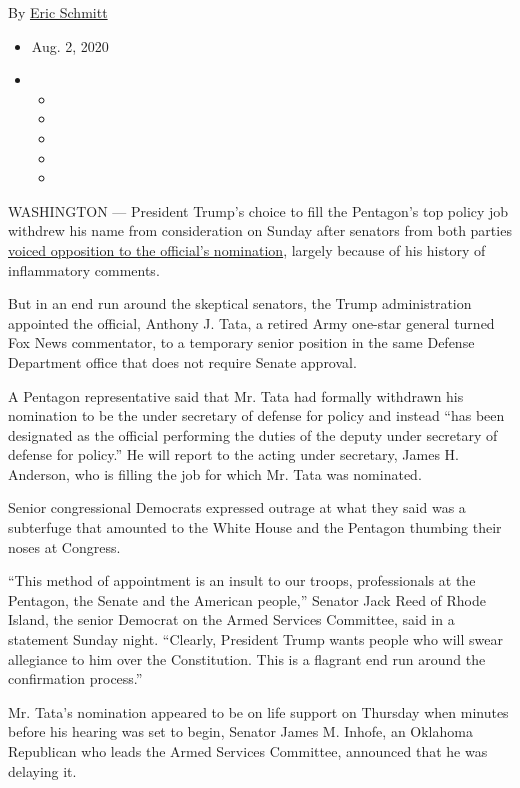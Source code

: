 By \href{https://www.nytimes3xbfgragh.onion/by/eric-schmitt}{Eric
Schmitt}

\begin{itemize}
\item
  Aug. 2, 2020
\item
  \begin{itemize}
  \item
  \item
  \item
  \item
  \item
  \end{itemize}
\end{itemize}

WASHINGTON --- President Trump's choice to fill the Pentagon's top
policy job withdrew his name from consideration on Sunday after senators
from both parties
\href{https://www.nytimes3xbfgragh.onion/2020/07/30/us/politics/trump-inhofe-tata-pentagon.html}{voiced
opposition to the official's nomination}, largely because of his history
of inflammatory comments.

But in an end run around the skeptical senators, the Trump
administration appointed the official, Anthony J. Tata, a retired Army
one-star general turned Fox News commentator, to a temporary senior
position in the same Defense Department office that does not require
Senate approval.

A Pentagon representative said that Mr. Tata had formally withdrawn his
nomination to be the under secretary of defense for policy and instead
``has been designated as the official performing the duties of the
deputy under secretary of defense for policy.'' He will report to the
acting under secretary, James H. Anderson, who is filling the job for
which Mr. Tata was nominated.

Senior congressional Democrats expressed outrage at what they said was a
subterfuge that amounted to the White House and the Pentagon thumbing
their noses at Congress.

``This method of appointment is an insult to our troops, professionals
at the Pentagon, the Senate and the American people,'' Senator Jack Reed
of Rhode Island, the senior Democrat on the Armed Services Committee,
said in a statement Sunday night. ``Clearly, President Trump wants
people who will swear allegiance to him over the Constitution. This is a
flagrant end run around the confirmation process.''

Mr. Tata's nomination appeared to be on life support on Thursday when
minutes before his hearing was set to begin, Senator James M. Inhofe, an
Oklahoma Republican who leads the Armed Services Committee, announced
that he was delaying it.

